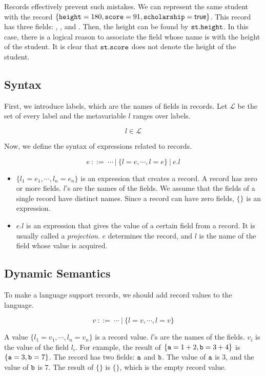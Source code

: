 Records
effectively prevent such mistakes. We can represent the same student with the
record $\{\texttt{height}=180,\texttt{score}=91,\texttt{scholarship}=\textsf{true}\}$.
This record has three fields: , , and
.
Then, the height can be found by $\texttt{st}.\texttt{height}$. In this case, there
is a logical reason to associate the field whose name is  with the
height of the student. It is clear that $\texttt{st}.\texttt{score}$ does not denote
the height of the student.

\subsection{Syntax}

First, we
introduce labels, which are the names of fields in records. Let $\mathcal{L}$
be the set of every label and the metavariable $l$ ranges over labels.

\[ l \in \mathcal{L} \]

Now, we define the syntax of expressions related to records.

\[ e\ ::= \ \cdots \ |\ \{l=e,\cdots,l=e\} \ |\ e.l \]

\begin{itemize}
  \item
    $\{l_1=e_1,\cdots,l_n=e_n\}$ is an expression that creates a record. A
    record has zero or more fields. $l$'s are the names of the fields.
    We assume that the fields of a single record have distinct names.
    Since a record can have zero fields, $\{\}$ is an expression.
  \item
    $e.l$ is an expression that gives the value of a certain field from a record.
    It is usually called a
    \textit{projection}. $e$ determines the record,
    and $l$ is the name of the field whose value is acquired.
\end{itemize}

\subsection{Dynamic Semantics}

To make a language support records, we should add record values to the
language.

\[ v \ ::= \ \cdots \ |\ \{l=v,\cdots,l=v\} \]

A value $\{l_1=v_1,\cdots,l_n=v_n\}$ is a record value. $l$'s are the names of the
fields. $v_i$ is the value of the field $l_i$. For example, the result of
$\{\texttt{a}=1+2,\texttt{b}=3+4\}$ is $\{\texttt{a}=3,\texttt{b}=7\}$. The record has two fields: $\texttt{a}$ and
$\texttt{b}$. The value of $\texttt{a}$ is $3$, and the value of $\texttt{b}$ is $7$. The result of
$\{\}$ is $\{\}$, which is the empty record value.

